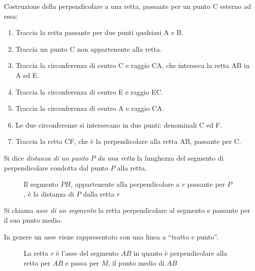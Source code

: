 \begin{procedura}
	Costruzione della perpendicolare a una retta, passante per un punto C esterno ad essa:
	\begin{enumerate} [nosep]
		\item 
		Traccia la retta passante per due punti qualsiasi A e B.
		\item 
		Traccia un punto C non appartenente alla retta.
		\item 
		Traccia la circonferenza di centro C e raggio CA, che interseca la retta AB 
		in A ed E. 
		\item 
		Traccia la circonferenza di centro E e raggio EC. 
		\item 
		Traccia la circonferenza di centro A e raggio CA.
		\item 
		Le due circonferenze si intersecano in due punti: denominali C ed F. 
		\item 
		Traccia la retta CF, che è la perpendicolare alla retta AB, passante per C.
		\end{enumerate}
\end{procedura}

\begin{definizione}
Si dice \emph{distanza di un punto $P$ da una retta} la lunghezza del 
segmento di perpendicolare condotta dal punto $P$ alla retta.
\end{definizione}


\begin{inaccessibleblock}
 \begin{figure}[htb]
\centering
\caption{Il segmento $PH$, appartenente alla perpendicolare a $r$ 
passante per $P$, è la distanza di $P$ dalla retta $r$}
\end{figure}
\end{inaccessibleblock}

\begin{definizione}\label{def:asse_segmento}
Si chiama \emph{asse di un segmento} la retta perpendicolare al 
segmento e passante per il suo punto medio.
\end{definizione}

In genere un asse viene rappresentato con una linea a ``tratto e 
punto''.


\begin{inaccessibleblock}
 \begin{figure}[htb]
\centering
\caption{La retta $r$ è l'asse del segmento $AB$ in quanto è 
perpendicolare alla retta per $AB$ e passa per $M$, il punto medio di 
$AB$}\label{fig:1.38}
\end{figure}
\end{inaccessibleblock}

